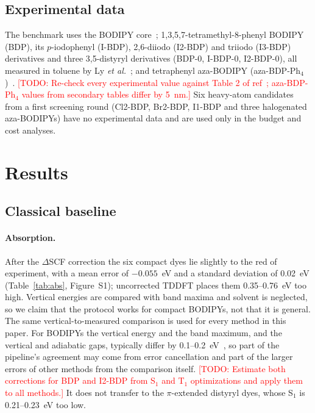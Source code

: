 \documentclass[journal=jctcce,manuscript=article,layout=twocolumn]{achemso}
\newcommand{\todo}[1]{\textcolor{red}{[TODO: #1]}}
\begin{document}
\subsection{Experimental data}

The benchmark uses the BODIPY core~\cite{Schmitt2009}; 1,3,5,7-tetramethyl-8-phenyl BODIPY (BDP), its
$p$-iodophenyl (I-BDP), 2,6-diiodo (I2-BDP) and triiodo (I3-BDP) derivatives and three 3,5-distyryl
derivatives (BDP-0, I-BDP-0, I2-BDP-0), all measured in toluene by Ly \emph{et al.}~\cite{Ly2021}; and
tetraphenyl aza-BODIPY (aza-BDP-Ph$_4$)~\cite{Killoran2002,Gorman2004,Loudet2008}. \todo{Re-check every
experimental value against Table 2 of ref~\citenum{Ly2021}; aza-BDP-Ph$_4$ values from secondary tables
differ by 5~nm.} Six heavy-atom candidates from a first screening round (Cl2-BDP, Br2-BDP, I1-BDP and
three halogenated aza-BODIPYs) have no experimental data and are used only in the budget and cost analyses.

\section{Results}

\subsection{Classical baseline}
\label{sec:baseline}

\paragraph{Absorption.} After the $\Delta$SCF correction the six compact dyes lie slightly to the red of
experiment, with a mean error of $-0.055$~eV and a standard deviation of 0.02~eV (Table~\ref{tab:abs},
Figure~S1); uncorrected TDDFT places them 0.35--0.76~eV too high. Vertical energies are
compared with band maxima and solvent is neglected, so we claim that the protocol works for compact
BODIPYs, not that it is general. The same vertical-to-measured comparison is used for every method in this
paper. For BODIPYs the vertical energy and the band maximum, and the vertical and adiabatic gaps, typically
differ by 0.1--0.2~eV~\cite{Momeni2015,Chibani2013}, so part of the pipeline's agreement may come from
error cancellation and part of the larger errors of other methods from the comparison itself.
\todo{Estimate both corrections for BDP and I2-BDP from S$_1$ and T$_1$ optimizations and apply them to all
methods.} It does not transfer to the $\pi$-extended distyryl dyes, whose S$_1$ is
0.21--0.23~eV too low.
\end{document}
